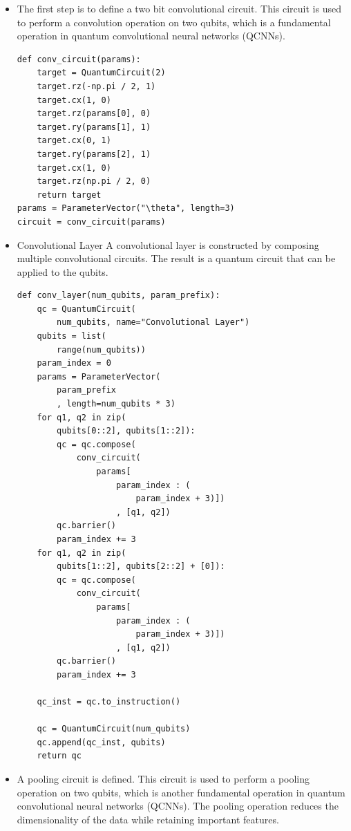 \documentclass[conference]{IEEEtran}
\begin{document}
\begin{itemize}
\item The first step is to define a two bit convolutional circuit. This circuit is used to perform a convolution operation on two qubits, which is a fundamental operation in quantum convolutional neural networks (QCNNs).
{\small
\begin{verbatim}
def conv_circuit(params):
    target = QuantumCircuit(2)
    target.rz(-np.pi / 2, 1)
    target.cx(1, 0)
    target.rz(params[0], 0)
    target.ry(params[1], 1)
    target.cx(0, 1)
    target.ry(params[2], 1)
    target.cx(1, 0)
    target.rz(np.pi / 2, 0)
    return target
params = ParameterVector("\theta", length=3)
circuit = conv_circuit(params)
\end{verbatim}}
    

    \item Convolutional Layer
    A convolutional layer is constructed by composing multiple convolutional circuits. The result is a quantum circuit that can be applied to the qubits.

{\small
\begin{verbatim}
def conv_layer(num_qubits, param_prefix):
    qc = QuantumCircuit(
        num_qubits, name="Convolutional Layer")
    qubits = list(
        range(num_qubits))
    param_index = 0
    params = ParameterVector(
        param_prefix
        , length=num_qubits * 3)
    for q1, q2 in zip(
        qubits[0::2], qubits[1::2]):
        qc = qc.compose(
            conv_circuit(
                params[
                    param_index : (
                        param_index + 3)])
                    , [q1, q2])
        qc.barrier()
        param_index += 3
    for q1, q2 in zip(
        qubits[1::2], qubits[2::2] + [0]):
        qc = qc.compose(
            conv_circuit(
                params[
                    param_index : (
                        param_index + 3)])
                    , [q1, q2])
        qc.barrier()
        param_index += 3

    qc_inst = qc.to_instruction()

    qc = QuantumCircuit(num_qubits)
    qc.append(qc_inst, qubits)
    return qc
\end{verbatim}
}

    \item A pooling circuit is defined. This circuit is used to perform a pooling operation on two qubits, which is another fundamental operation in quantum convolutional neural networks (QCNNs). The pooling operation reduces the dimensionality of the data while retaining important features.



\end{itemize}
\end{document}
